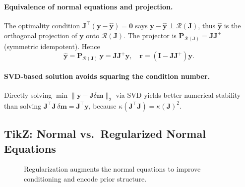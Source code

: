 \documentclass[11pt,a4paper]{article}
\begin{document}
\paragraph{Equivalence of normal equations and projection.}
The optimality condition $\mathbf{J}^\top(\mathbf{y}-\widehat{\mathbf{y}})=\mathbf{0}$ says $\mathbf{y}-\widehat{\mathbf{y}}\perp \mathcal{R}(\mathbf{J})$, thus $\widehat{\mathbf{y}}$ is the orthogonal projection of $\mathbf{y}$ onto $\mathcal{R}(\mathbf{J})$. The projector is $\mathbf{P}_{\mathcal{R}(\mathbf{J})}=\mathbf{J}\mathbf{J}^+$ (symmetric idempotent). Hence
\[
\widehat{\mathbf{y}} = \mathbf{P}_{\mathcal{R}(\mathbf{J})}\,\mathbf{y}=\mathbf{J}\mathbf{J}^+ \mathbf{y},\quad
\mathbf{r} = (\mathbf{I}-\mathbf{J}\mathbf{J}^+)\mathbf{y}.
\]

\paragraph{SVD-based solution avoids squaring the condition number.}
Directly solving $\min\|\mathbf{y}-\mathbf{J}\delta\mathbf{m}\|_2$ via SVD yields better numerical stability than solving $\mathbf{J}^\top \mathbf{J}\,\delta\mathbf{m}=\mathbf{J}^\top \mathbf{y}$, because $\kappa(\mathbf{J}^\top\mathbf{J})=\kappa(\mathbf{J})^2$.

\subsection{TikZ: Normal vs.\ Regularized Normal Equations}
\begin{figure}[h!]
\centering
{}
\caption{Regularization augments the normal equations to improve conditioning and encode prior structure.}
\end{figure}
\end{document}
